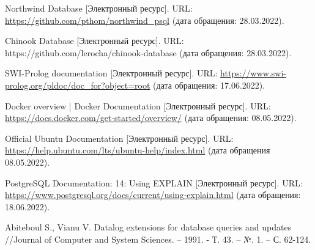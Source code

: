\begin{thebibliography}{3}
	Northwind Database [Электронный ресурс]. URL: \url{https://github.com/pthom/northwind\_psql} (дата обращения: 28.03.2022).
	
	Chinook Database [Электронный ресурс]. URL: https://github.com/lerocha/chinook-database (дата обращения: 28.03.2022).
	
	SWI-Prolog documentation [Электронный ресурс]. URL: \url{https://www.swi-prolog.org/pldoc/doc\_for?object=root} (дата обращения: 17.06.2022).
	
	Docker overview | Docker Documentation [Электронный ресурс]. URL: \url{https://docs.docker.com/get-started/overview/} (дата обращения: 08.05.2022).	
	
	Official Ubuntu Documentation [Электронный ресурс]. URL: 
	\url{https://help.ubuntu.com/lts/ubuntu-help/index.html} (дата обращения 08.05.2022).
	
	PostgreSQL Documentation: 14: Using EXPLAIN [Электронный ресурс]. URL:  \url{https://www.postgresql.org/docs/current/using-explain.html} (дата обращения: 18.06.2022).
	
	Abiteboul S., Vianu V. Datalog extensions for database queries and updates //Journal of Computer and System Sciences. – 1991. - Т. 43. – №. 1. – С. 62-124.
	
\end{thebibliography}
